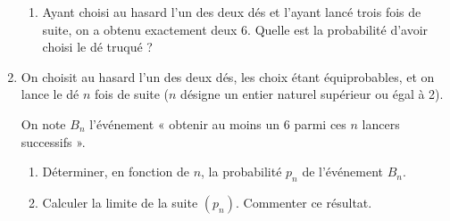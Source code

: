 \begin{enumerate}
\begin{enumerate}[label=\alph*.]
          \item
          Ayant choisi au hasard l'un des deux dés et l'ayant lancé trois fois de suite, on a obtenu exactement deux 6. Quelle est la probabilité d'avoir choisi le dé truqué ?
     \end{enumerate}
     \item
     On choisit au hasard l'un des deux dés, les choix étant équiprobables, et on lance le dé $n$ fois de suite ($n$ désigne un entier naturel supérieur ou égal à 2).
     \par
     On note $B_{n}$ l'événement « obtenir au moins un 6 parmi ces $n$ lancers successifs ».
     \begin{enumerate}[label=\alph*.]
          \item
          Déterminer, en fonction de $n$, la probabilité $p_{n}$ de l'événement $B_{n}$.
          \item
          Calculer la limite de la suite $\left(p_{n}\right)$. Commenter ce résultat.
     \end{enumerate}
\end{enumerate}

